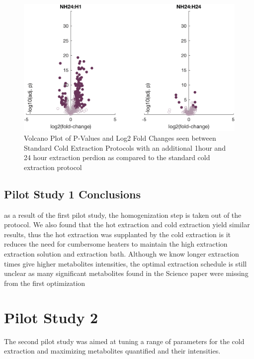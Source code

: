 \documentclass[a4paper,11pt,twoside]{book}
\begin{document}
	\begin{figure}[!htb]
		\centering
		\includegraphics[width=\linewidth]{2.Optimizaiton_Figures/NH24}
		\caption{Volcano Plot of P-Values and Log2 Fold Changes seen between Standard Cold Extraction Protocols with an additional 1hour and 24 hour extraction perdion as compared to the standard cold extraction protocol}
		\label{volcano plot: Effect of Homogenization of Metabolite Extraction}
	\end{figure}
	
	\subsection*{Pilot Study 1 Conclusions}
	
	as a result of the first pilot study, the homogenization step is taken out of the protocol. We also found that the hot extraction and cold extraction yield similar results, thus the hot extraction was supplanted by the cold extraction is it reduces the need for cumbersome heaters to maintain the high extraction extraction solution and extraction bath. Although we know longer extraction times give higher metabolites intensities, the optimal extraction schedule is still unclear as many significant metabolites found in the Science paper \citep{Williams2016SystemsFunction} were missing from the first optimization
	
	\newpage
	\section{Pilot Study 2}
	
	The second pilot study was aimed at tuning a range of parameters for the cold extraction and maximizing metabolites quantified and their intensities.
\end{document}
